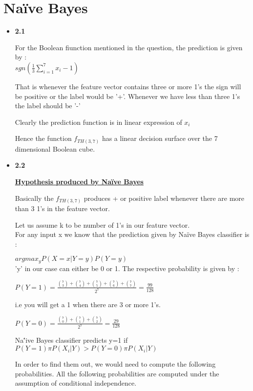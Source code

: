 \documentclass[11pt]{article}
\begin{document}
\pagebreak

\section{Na\"ive Bayes}
\begin{itemize}
	
\item[] \textbf{2.1} 

For the Boolean fiunction mentioned in the question, the prediction is given by :\\

$\boxed{sgn(\frac{1}{3} \sum_{i=1}^{7}  x_i -1 )}$

That is whenever the feature vector contains three or more 1's the sign will be positive or the label would be '+'. Whenever we have less than three 1's the label should be '-'

Clearly the prediction function is in linear expression of $x_i$

Hence the function $f_{TH(3,7)}$ has a linear decision surface over the 7 dimensional Boolean cube.

\item[] \textbf{2.2} 

\textbf{\underline{ Hypothesis produced by Na\"ive Bayes}}

Basically the $f_{TH(3,7)}$ produces + or positive label whenever there are more than 3 1's in the feature vector.

Let us assume k to be number of 1's in our feature vector.\\

For any input x we know that the prediction given by Na\"ive Bayes classifier is :

$ argmax_y  P(X=x|Y=y) P(Y=y)$\\

'y' in our case can either be 0 or 1. The respective probability is given by :

$P(Y=1) =\frac{\binom{7}{3} + \binom{7}{4} + \binom{7}{5} + \binom{7}{6} + \binom{7}{7} } { 2^7} = \frac{99}{128}$

i.e you will get a 1 when there are 3 or more 1's.

$P(Y=0) =\frac{\binom{7}{0} + \binom{7}{1} + \binom{7}{2} } { 2^7} = \frac{29}{128}$

Na\''ive Bayes classifier predicts y=1 if\\
$P(Y=1) \pi P(X_i | Y) > P(Y=0) \pi P(X_i | Y)$

In order to find them out, we would need to compute the following probabilities. All the following probabilities are computed under the assumption of conditional independence.


\end{itemize}
\end{document}
